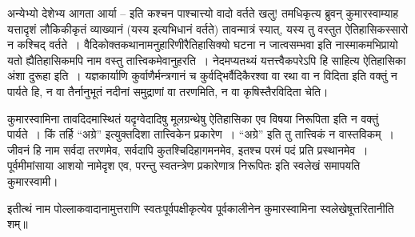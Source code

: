 अन्येभ्यो देशेभ्य आगता आर्या – इति कश्चन पाश्चात्त्यो वादो वर्तते खलु! तमधिकृत्य ब्रुवन् कुमारस्वाम्याह यत्तादृशं लौकिकीकृतं व्याख्यानं (यस्य  इत्यभिधानं वर्तते) तावन्मात्रं स्यात्, यस्य तु वस्तुत ऐतिहासिकस्सारो न कश्चिद् वर्तते~। वैदिकोक्तकथानामनुहारिणीरैतिहासिक्यो घटना न जात्वसम्भवा इति नास्माकमभिप्रायो यतो ह्यैतिहासिकमपि नाम वस्तु तात्त्विकमेवानुहरति~। नेदमप्यतथ्यं यत्तत्त्वैकपरेऽपि हि साहित्य ऐतिहासिका अंशा दुरूहा इति~। यज्ञकार्याणि कुर्वाणैर्मन्त्रगानं च कुर्वद्भिर्वैदिकैरश्वा वा रथा वा न विदिता इति वक्तुं न पार्यते हि, न वा तैर्नानुभूतं नदीनां समुद्राणां वा तरणमिति, न वा कृषिस्तैरविदिता चेति।

कुमारस्वामिना तावदिदमास्थितं यदृग्वेदादिषु मूलग्रन्थेषु ऐतिहासिका एव विषया निरूपिता इति न वक्तुं पार्यते~। किं तर्हि “अग्रे” इत्युक्तदिशा तात्त्विकेन प्रकारेण~। “अग्रे” इति तु तात्त्विकं न वास्तविकम्~। जीवनं हि नाम सर्वदा तरणमेव, सर्वदापि कुतश्चिदिहागमनमेव, इतश्च परमं पदं प्रति प्रस्थानमेव~। पूर्वमीमांसाया आशयो नामेदृश एव, परन्तु स्वतन्त्रेण प्रकारेणात्र निरूपितः इति स्वलेखं समापयति कुमारस्वामी।

इतीत्थं नाम पोल्लाकवादानामुत्तराणि स्वतःपूर्वपक्षीकृत्येव पूर्वकालीनेन कुमारस्वामिना स्वलेखेषूत्तरितानीति शम्॥

\egroup

